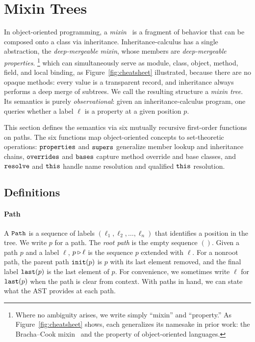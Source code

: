 \section{Mixin Trees}
\label{sec:mixin-trees}

In object-oriented programming, a
\emph{mixin}~\cite{bracha1990-mixin-inheritance} is a fragment of behavior
that can be composed onto a class via inheritance.
Inheritance-calculus has a single abstraction, the
\emph{deep-mergeable mixin}, whose members are
\emph{deep-mergeable properties}.%
\footnote{
  Where no ambiguity arises, we write simply ``mixin'' and ``property.''
  As Figure~\ref{fig:cheatsheet} shows, each generalizes its namesake in prior
  work: the Bracha--Cook mixin~\cite{bracha1990-mixin-inheritance} and the
  property of object-oriented languages.
}
which can simultaneously serve as module, class, object, method, field, and
local binding, as Figure~\ref{fig:cheatsheet} illustrated, because there
are no opaque methods: every value is
a transparent record, and inheritance always performs a deep
merge of subtrees.
We call the resulting structure a \emph{mixin tree}.
Its semantics is purely \emph{observational}: given an
inheritance-calculus program, one queries whether a
label $\ell$ is a property at a given position $p$.

This section defines the semantics via six mutually recursive
first-order functions on paths.
The six functions map object-oriented concepts to
set-theoretic operations: $\mathtt{properties}$ and $\mathtt{supers}$
generalize member lookup and inheritance chains,
$\mathtt{overrides}$ and $\mathtt{bases}$ capture method override and
base classes, and $\mathtt{resolve}$ and $\mathtt{this}$ handle name
resolution and qualified $\mathtt{this}$ resolution.

\subsection{Definitions}
\label{sec:definitions}

\paragraph{Path}
A $\mathtt{Path}$ is a sequence of labels
$(\ell_1, \ell_2, \ldots, \ell_n)$ that identifies a position in
the tree.
We write $p$ for a path.
The \emph{root path} is the empty sequence $()$.
Given a path $p$ and a label $\ell$,
$p \mathbin{\triangleright} \ell$ is the sequence $p$ extended with $\ell$.
For a nonroot path, the parent path $\mathtt{init}(p)$ is $p$ with
its last element removed,
and the final label $\mathtt{last}(p)$ is the last element of $p$.
For convenience, we sometimes write $\ell$ for $\mathtt{last}(p)$
when the path is clear from context.
With paths in hand, we can state what the AST provides
at each path.

